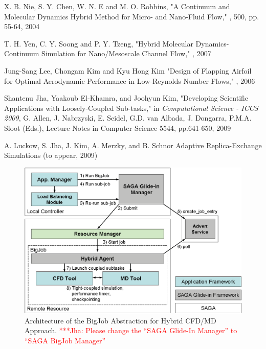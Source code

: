 \documentclass[a4paper]{article}
\newcommand{\jhanote}[1]{ {\textcolor{red} { ***Jha: #1 }}}
\newcommand{\jhanote}[1]{}
\begin{document}
\begin{thebibliography}{99}
X. B. Nie, S. Y. Chen, W. N. E and M. O. Robbins,
\newblock "A Continuum and Molecular Dynamics Hybrid Method for Micro- and Nano-Fluid Flow,"
, 500, pp. 55-64, 2004

T. H. Yen, C. Y. Soong and P. Y. Tzeng,
\newblock "Hybrid Molecular Dynamics-Continuum Simulation for Nano/Mesoscale Channel Flow,"
, 2007

Jung-Sang Lee, Chongam Kim and Kyu Hong Kim
\newblock "Design of Flapping Airfoil for Optimal Aerodynamic Performance in Low-Reynolds Number Flows,"
, 2006

Shantenu Jha, Yaakoub El-Khamra, and Joohyun Kim,
\newblock "Developing Scientific Applications with Loosely-Coupled Sub-tasks,"
\newblock in {\em Computational Science - ICCS 2009}, G. Allen, J. Nabrzyski, E. Seidel, G.D. van Albada, J. Dongarra, P.M.A. Sloot (Eds.), Lecture Notes in Computer Science 5544, pp.641-650, 2009

A. Luckow, S. Jha, J. Kim, A. Merzky, and B. Schnor
\newblock Adaptive Replica-Exchange Simulations
 (to appear, 2009)
\end{thebibliography}

\vspace{12pt}



\begin{figure}
\centering
\includegraphics  [scale=0.33, angle=270]{Image2}
\caption{Architecture of the BigJob Abstraction for Hybrid CFD/MD Approach. \jhanote{Please change the ``SAGA Glide-In Manager'' to ``SAGA BigJob Manager''}}
\end{figure}
\end{document}
